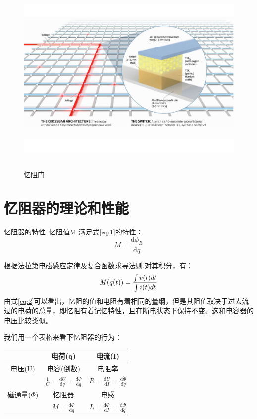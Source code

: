 \documentclass[UTF8]{article}
\begin{document}
\begin{figure}[htbp]
\centering
\includegraphics[width=5.77in,height=3.75in]{pic/71}

\caption{忆阻门}
\label{fig:7}
\end{figure}




\section{忆阻器的理论和性能}

忆阻器的特性--忆阻值M 满足式\eqref{eq:1}的特性：
\begin{equation}\label{eq:1}
M = \frac{\mathrm d\phi_{B}}{\mathrm dq}
\end{equation}

根据法拉第电磁感应定律及复合函数求导法则.对其积分，有：
\begin{equation}\label{eq:2}
M(q(t)) = \frac{\int\mathnormal{v(t)dt}}{\int\mathnormal{i(t)dt}}
\end{equation}
由式\eqref{eq:2}可以看出，忆阻的值和电阻有着相同的量纲，但是其阻值取决于过去流过的电荷的总量，即忆阻有着记忆特性，且在断电状态下保持不变。这和电容器的电压比较类似。

我们用一个表格来看下忆阻器的行为：

\begin{tabular}{|c|c|c|}
\hline
& 电荷(q)& 电流(I) \\

 \hline
电压(U)  & 电容(倒数) &电阻率 \\
     & $\frac{1}{C}=\frac{\mathrm{d}U}{\mathrm{d}q}=\frac{\mathrm{d}\dot \Phi}{\mathrm{d}q}$  &   $R=\frac{\mathrm{d}U}{\mathrm{d}I}=\frac{\mathrm{d}\dot \Phi}{\mathrm{d}\dot{q}}$ \\
 \hline
磁通量($\Phi$)  & 忆阻器 & 电感 \\
     & $M=\frac{\mathrm{d}\Phi}{\mathrm{d}q}$  &  $L=\frac{\mathrm{d}\Phi}{\mathrm{d}I}=\frac{\mathrm{d}\Phi}{\mathrm{d}\dot{q}}$ \\
 \hline

\end{tabular}
\end{document}
